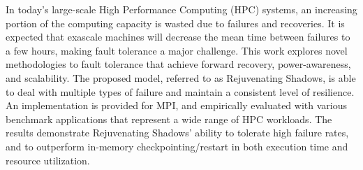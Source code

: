 In today's large-scale High Performance Computing (HPC) systems, an increasing portion of the computing capacity is wasted due to failures and recoveries. It is expected that exascale machines will decrease the mean time between failures to a few hours, making fault tolerance a major challenge. This work explores novel methodologies to fault tolerance that achieve forward recovery, power-awareness, and scalability. The proposed model, referred to as Rejuvenating Shadows, is able to deal with multiple types of failure and maintain a consistent level of resilience. An implementation is provided for MPI, and empirically evaluated with various benchmark applications that represent a wide range of HPC workloads. The results demonstrate Rejuvenating Shadows' ability to tolerate high failure rates, and to outperform in-memory checkpointing/restart in both execution time and resource utilization.


